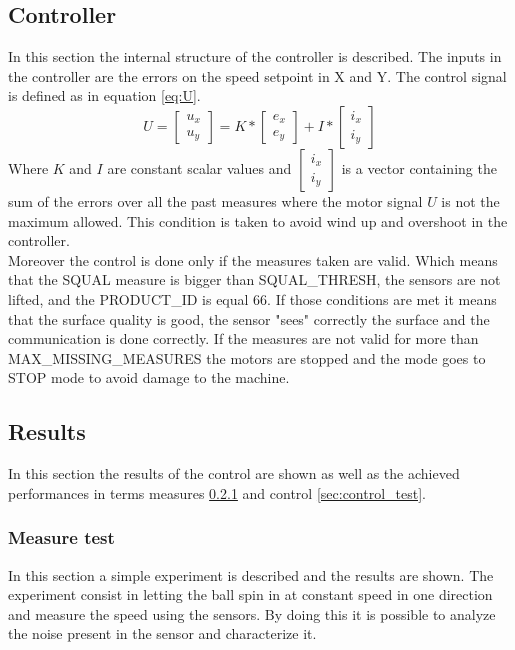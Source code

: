 \documentclass[12pt,a4paper]{article}
\begin{document}
\subsection{Controller} \label{sec:controller}
In this section the internal structure of the controller is described.
The inputs in the controller are the errors on the speed setpoint in X and Y. The control signal is defined as in equation \ref{eq:U}.
\begin{equation}\label{eq:U}
U = 
\begin{bmatrix}
u_x\\
u_y
\end{bmatrix}
= K * 
\begin{bmatrix}
e_x\\
e_y
\end{bmatrix} + I *
\begin{bmatrix}
i_x\\
i_y
\end{bmatrix} 
\end{equation}
Where $K$ and $I$ are constant scalar values and $\begin{bmatrix}i_x\\i_y\end{bmatrix}$ is a vector containing the sum of the errors over all the past measures where the motor signal $U$ is not the maximum allowed. This condition is taken to avoid wind up and overshoot in the controller.\\
Moreover the control is done only if the measures taken are valid. Which means that the SQUAL measure is bigger than SQUAL\_THRESH, the sensors are not lifted, and the PRODUCT\_ID is equal 66.
If those conditions are met it means that the surface quality is good, the sensor "sees" correctly the surface and the communication is done correctly.
If the measures are not valid for more than MAX\_MISSING\_MEASURES the motors are stopped and the mode goes to STOP mode to avoid damage to the machine.
\subsection{Results}
In this section the results of the control are shown as well as the achieved performances in terms measures \ref{sec:measure_test} and control \ref{sec:control_test}.
\subsubsection{Measure test}\label{sec:measure_test}
In this section a simple experiment is described and the results are shown. The experiment consist in letting the ball spin in at constant speed in one direction and measure the speed using the sensors. By doing this it is possible to analyze the noise present in the sensor and characterize it.
\end{document}
